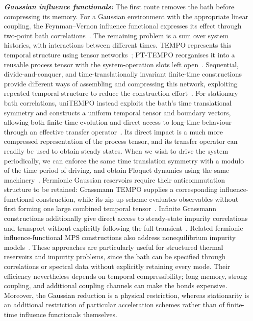 \textbf{\emph{Gaussian influence functionals:}}
The first route removes the bath before compressing its memory.
For a Gaussian environment with the appropriate linear coupling, the Feynman--Vernon influence functional expresses its effect through two-point bath correlations~\cite{FeynmanVernon1963}.
The remaining problem is a sum over system histories, with interactions between different times.
TEMPO represents this temporal structure using tensor networks~\cite{Strathearn2018}; PT-TEMPO reorganises it into a reusable process tensor with the system-operation slots left open~\cite{Jorgensen2019}.
Sequential, divide-and-conquer, and time-translationally invariant finite-time constructions provide different ways of assembling and compressing this network, exploiting repeated temporal structure to reduce the construction effort~\cite{cygorek2024sublinear,guo2024influence}.
For stationary bath correlations, uniTEMPO instead exploits the bath's time translational symmetry and constructs a uniform temporal tensor and boundary vectors, allowing both finite-time evolution and direct access to long-time behaviour through an effective transfer operator~\cite{Link2024Infinite}.
Its direct impact is a much more compressed representation of the process tensor, and its transfer operator can readily be used to obtain steady states. When we wish to drive the system periodically, we can enforce the same time translation symmetry with a modulo of the time period of driving, and obtain Floquet dynamics using the same machinery~\cite{Mickiewicz2026Floquet}.
Fermionic Gaussian reservoirs require their anticommutation structure to be retained: Grassmann TEMPO supplies a corresponding influence-functional construction, while its zip-up scheme evaluates observables without first forming one large combined temporal tensor~\cite{Chen2024GTEMPO}.
Infinite Grassmann constructions additionally give direct access to steady-state impurity correlations and transport without explicitly following the full transient~\cite{GuoChen2024InfiniteSteady}.
Related fermionic influence-functional MPS constructions also address nonequilibrium impurity models~\cite{Thoenniss2023Impurity,Ng2023Impurity}.
These approaches are particularly useful for structured thermal reservoirs and impurity problems, since the bath can be specified through correlations or spectral data without explicitly retaining every mode.
Their efficiency nevertheless depends on temporal compressibility; long memory, strong coupling, and additional coupling channels can make the bonds expensive.
Moreover, the Gaussian reduction is a physical restriction, whereas stationarity is an additional restriction of particular acceleration schemes rather than of finite-time influence functionals themselves.

